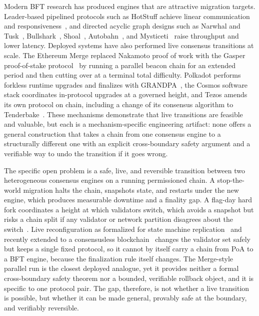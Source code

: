 \documentclass[journal]{IEEEtran}
\begin{document}
Modern BFT research has produced engines that are attractive migration targets.
Leader-based pipelined protocols such as HotStuff achieve linear communication and
responsiveness~\cite{hotstuff}, and directed acyclic graph designs such as Narwhal and
Tusk~\cite{narwhal}, Bullshark~\cite{bullshark}, Shoal~\cite{shoal},
Autobahn~\cite{autobahn}, and Mysticeti~\cite{mysticeti} raise throughput and lower
latency. Deployed systems have also performed live consensus transitions at scale. The
Ethereum Merge replaced Nakamoto proof of work with the Gasper proof-of-stake
protocol~\cite{gasper,casperffg} by running a parallel beacon chain for an extended period
and then cutting over at a terminal total difficulty. Polkadot performs forkless runtime
upgrades and finalizes with GRANDPA~\cite{grandpa}, the Cosmos software stack coordinates
in-protocol upgrades at a governed height, and Tezos amends its own protocol on chain,
including a change of its consensus algorithm to Tenderbake~\cite{tenderbake}. These
mechanisms demonstrate that live transitions are feasible and valuable, but each is a
mechanism-specific engineering artifact: none offers a general construction that takes a
chain from one consensus engine to a structurally different one with an explicit
cross-boundary safety argument and a verifiable way to undo the transition if it
goes wrong.

The specific open problem is a safe, live, and reversible transition between two
heterogeneous consensus engines on a running permissioned chain. A stop-the-world
migration halts the chain, snapshots state, and restarts under the new engine, which
produces measurable downtime and a finality gap. A flag-day hard fork coordinates a height
at which validators switch, which avoids a snapshot but risks a chain split if any
validator or network partition disagrees about the switch~\cite{tendermint,bitcoin}. Live
reconfiguration as formalized for state machine replication~\cite{reconfig,bftsmart} and
recently extended to a consensusless blockchain~\cite{suilutris} changes the validator set
safely but keeps a single fixed protocol, so it cannot by itself carry a chain from PoA to
a BFT engine, because the finalization rule itself changes. The Merge-style parallel run is
the closest deployed analogue, yet it provides neither a formal cross-boundary safety
theorem nor a bounded, verifiable rollback object, and it is specific to one protocol pair.
The gap, therefore, is not whether a live transition is possible, but whether it can be
made general, provably safe at the boundary, and verifiably reversible.
\end{document}
